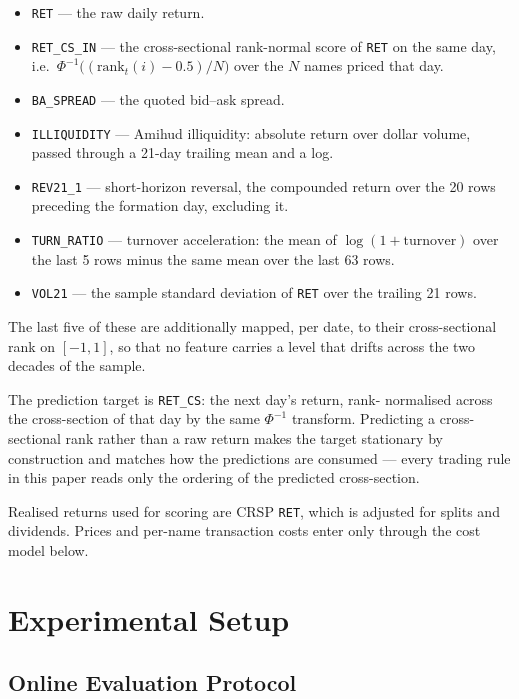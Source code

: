 \begin{itemize}\itemsep2pt
\item \texttt{RET} --- the raw daily return.
\item \texttt{RET\_CS\_IN} --- the cross-sectional rank-normal score of
      \texttt{RET} on the same day, i.e.\ $\Phi^{-1}\!\big((\mathrm{rank}_t(i)-0.5)/N\big)$
      over the $N$ names priced that day.
\item \texttt{BA\_SPREAD} --- the quoted bid--ask spread.
\item \texttt{ILLIQUIDITY} --- Amihud illiquidity: absolute return over
      dollar volume, passed through a 21-day trailing mean and a log.
\item \texttt{REV21\_1} --- short-horizon reversal, the compounded return
      over the 20 rows preceding the formation day, excluding it.
\item \texttt{TURN\_RATIO} --- turnover acceleration: the mean of
      $\log(1+\mathrm{turnover})$ over the last 5 rows minus the same mean
      over the last 63 rows.
\item \texttt{VOL21} --- the sample standard deviation of \texttt{RET}
      over the trailing 21 rows.
\end{itemize}

The last five of these are additionally mapped, per date, to their
cross-sectional rank on $[-1,1]$, so that no feature carries a level that
drifts across the two decades of the sample.

The prediction target is \texttt{RET\_CS}: the next day's return, rank-
normalised across the cross-section of that day by the same $\Phi^{-1}$
transform. Predicting a cross-sectional rank rather than a raw return
makes the target stationary by construction and matches how the
predictions are consumed --- every trading rule in this paper reads only
the ordering of the predicted cross-section.

Realised returns used for scoring are CRSP \texttt{RET}, which is adjusted
for splits and dividends. Prices and per-name transaction costs enter only
through the cost model below.

\section{Experimental Setup}

\subsection{Online Evaluation Protocol}

